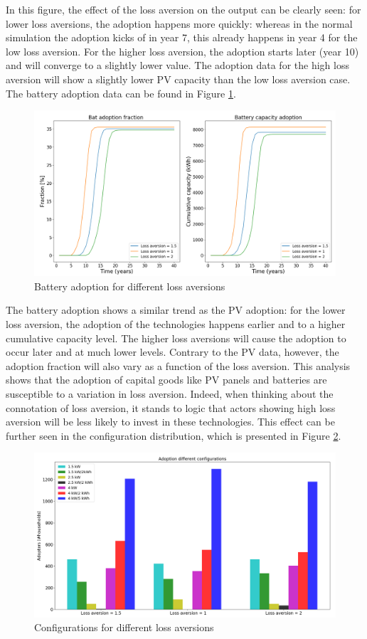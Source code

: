 \noindent
In this figure, the effect of the loss aversion on the output can be clearly seen: for lower loss aversions, the adoption happens more quickly: whereas in the normal simulation the adoption kicks of in year 7, this already happens in year 4 for the low loss aversion. For the higher loss aversion, the adoption starts later (year 10) and will converge to a slightly lower value. The adoption data for the high loss aversion will show a slightly lower PV capacity than the low loss aversion case. The battery adoption data can be found in Figure \ref{Figure:batlossvol}. 
\begin{figure}[h!]
\centering
\includegraphics[width=12cm]{ModelAnalysis/Batloss.png}
\caption{Battery adoption for different loss aversions}
\label{Figure:batlossvol}
\end{figure}
\noindent
The battery adoption shows a similar trend as the PV adoption: for the lower loss aversion, the adoption of the technologies happens earlier and to a higher cumulative capacity level. The higher loss aversions will cause the adoption to occur later and at much lower levels. Contrary to the PV data, however, the adoption fraction will also vary as a function of the loss aversion. This analysis shows that the adoption of capital goods like PV panels and batteries are susceptible to a variation in loss aversion. Indeed, when thinking about the connotation of loss aversion, it stands to logic that actors showing high loss aversion will be less likely to invest in these technologies. This effect can be further seen in the configuration distribution, which is presented in Figure \ref{Figure:configlossvol}. 
\begin{figure}[h!]
\centering
\includegraphics[width=12cm]{ModelAnalysis/Config.png}
\caption{Configurations for different loss aversions}
\label{Figure:configlossvol}
\end{figure}
